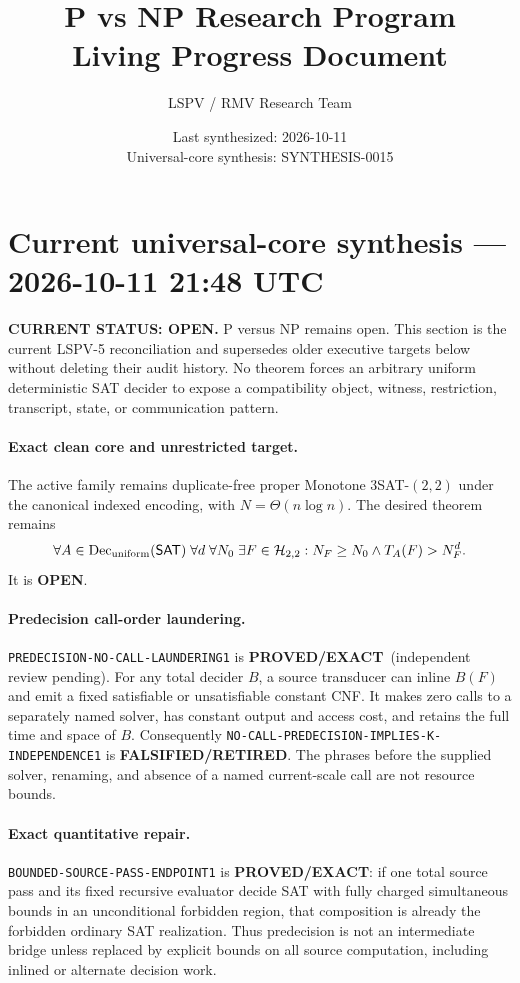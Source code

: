 \documentclass[11pt]{article}
\title{\bfseries P vs NP Research Program\\[0.25em]
\Large Living Progress Document}
\author{LSPV / RMV Research Team}
\date{Last synthesized: 2026-10-11\\ Universal-core synthesis: SYNTHESIS-0015}
\newcommand{\statusproved}{\textcolor{proved}{\textbf{PROVED/EXACT}}}
\newcommand{\statusopen}{\textcolor{openstatus}{\textbf{OPEN}}}
\newcommand{\statusretired}{\textcolor{retired}{\textbf{FALSIFIED/RETIRED}}}
\begin{document}
\section{Current universal-core synthesis --- 2026-10-11 21:48 UTC}

\begin{statusbox}
\textbf{CURRENT STATUS: OPEN.} P versus NP remains open. This section is the
current LSPV-5 reconciliation and supersedes older executive targets below
without deleting their audit history. No theorem forces an arbitrary uniform
deterministic SAT decider to expose a compatibility object, witness,
restriction, transcript, state, or communication pattern.
\end{statusbox}

\paragraph{Exact clean core and unrestricted target.}
The active family remains duplicate-free proper Monotone $3$SAT-$(2,2)$ under
the canonical indexed encoding, with $N=\Theta(n\log n)$. The desired theorem
remains
\[
 \forall A\in\operatorname{Dec}_{\rm uniform}(\mathsf{SAT})\;
 \forall d\;\forall N_0\;\exists F\in\mathcal H_{2,2}:
 N_F\ge N_0\land T_A(F)>N_F^d.
\]
It is \statusopen.

\paragraph{Predecision call-order laundering.}
\texttt{PREDECISION-NO-CALL-LAUNDERING1} is \statusproved\ (independent
review pending). For any total decider $B$, a source transducer can inline
$B(F)$ and emit a fixed satisfiable or unsatisfiable constant CNF. It makes
zero calls to a separately named solver, has constant output and access cost,
and retains the full time and space of $B$. Consequently
\texttt{NO-CALL-PREDECISION-IMPLIES-K-INDEPENDENCE1} is
\statusretired. The phrases before the supplied solver, renaming, and absence
of a named current-scale call are not resource bounds.

\paragraph{Exact quantitative repair.}
\texttt{BOUNDED-SOURCE-PASS-ENDPOINT1} is \statusproved: if one total
source pass and its fixed recursive evaluator decide SAT with fully charged
simultaneous bounds in an unconditional forbidden region, that composition is
already the forbidden ordinary SAT realization. Thus predecision is not an
intermediate bridge unless replaced by explicit bounds on all source
computation, including inlined or alternate decision work.
\end{document}
